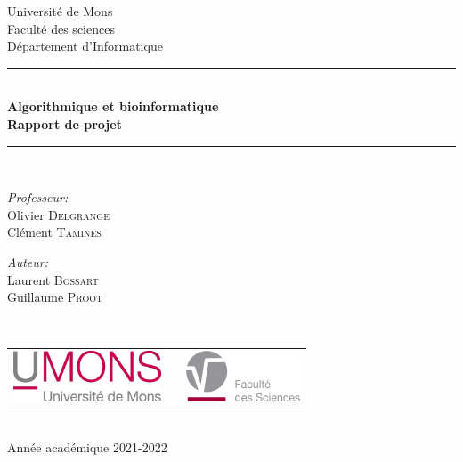 \documentclass[a4paper, 12pt]{article}
\begin{document}
\begin{titlepage}
\begin{center}

{\Large Université de Mons}\\[1ex]
{\Large Faculté des sciences}\\[1ex]
{\Large Département d'Informatique}\\[2.5cm]

\newcommand{\HRule}{\rule{\linewidth}{0.3mm}}
\HRule \\[0.3cm]
{ \LARGE \bfseries Algorithmique et bioinformatique \\[0.3cm]}
{ \LARGE \bfseries Rapport de projet \\[0.1cm]} %
\HRule \\[1.5cm]

\begin{minipage}[t]{0.45\textwidth}
\begin{flushleft} \large
\emph{Professeur:}\\
Olivier \textsc{Delgrange}\\
Clément \textsc{Tamines}
\end{flushleft}
\end{minipage}
\begin{minipage}[t]{0.45\textwidth}
\begin{flushright} \large
\emph{Auteur:} \\
Laurent \textsc{Bossart}\\
Guillaume \textsc{Proot}
\end{flushright}
\end{minipage}\\[2ex]

\vfill

\begin{center}
\begin{tabular}[t]{c c c}
\includegraphics[height=1.5cm]{logoumons.jpg} &
\hspace{0.3cm} &
\includegraphics[height=1.5cm]{logofs.jpg}
\end{tabular}
\end{center}~\\
 
{\large Année académique 2021-2022}

\end{center}
\end{titlepage}
\end{document}
